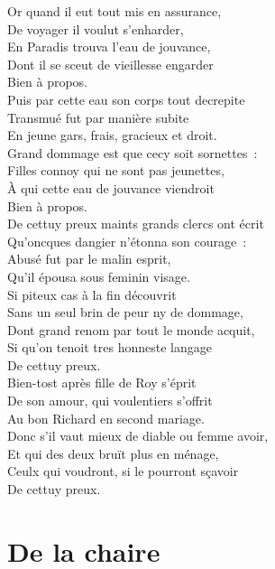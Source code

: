 \documentclass[french,twoside]{book} %
\newcommand\chapteropen{} %
\newcommand\chapterclose{} %
\begin{document}
Or quand il eut tout mis en assurance, \\
De voyager il voulut s’enharder, \\
En Paradis trouva l’eau de jouvance, \\
Dont il se sceut de vieillesse engarder \\
Bien à propos. \\
Puis par cette eau son corps tout decrepite \\
Transmué fut par manière subite \\
En jeune gars, frais, gracieux et droit. \\
Grand dommage est que cecy soit sornettes : \\
Filles connoy qui ne sont pas jeunettes, \\
À qui cette eau de jouvance viendroit \\
Bien à propos. \\
De cettuy preux maints grands clercs ont écrit \\
Qu'oncques dangier n’étonna son courage : \\
Abusé fut par le malin esprit, \\
Qu'il épousa sous feminin visage. \\
Si piteux cas à la fin découvrit \\
Sans un seul brin de peur ny de dommage, \\
Dont grand renom par tout le monde acquit, \\
Si qu’on tenoit tres honneste langage \\
De cettuy preux. \\
Bien-tost après fille de Roy s’éprit \\
De son amour, qui voulentiers s’offrit \\
Au bon Richard en second mariage. \\
Donc s’il vaut mieux de diable ou femme avoir, \\
Et qui des deux bruït plus en ménage, \\
Ceulx qui voudront, si le pourront sçavoir \\
De cettuy preux.
\chapterclose


\chapteropen
\chapter[{De la chaire}]{De la chaire}
\label{lb-chaire}\renewcommand{\leftmark}{De la chaire}
\end{document}

